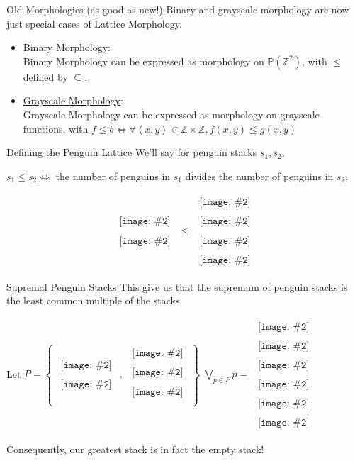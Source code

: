 \documentclass{beamer}
\newcommand{\pic}[2]{
     \begin{array}{l}
      \texttt{[image: \#2]}
      \end{array}
}
\newcommand{\set}[1]{\left\lbrace #1 \right\rbrace}
\newcommand{\tuple}[1]{\left\langle #1 \right\rangle}
\newcommand{\power}[1]{\mathbb{P}\left(#1\right)}
\newcommand{\integers}{\mathbb{Z}}
\newcommand{\join}[1]{\displaystyle\bigvee_{#1}}
\newcommand{\partialless}{\leqslant}
\newcommand{\penguin}[1]{
  \pic{width=#1}{images/tux.png}
}
\begin{document}
\begin{frame}{Old Morphologies (as good as new!)}
  Binary and grayscale morphology are now just special cases of 
  Lattice Morphology.
  \begin{itemize}
    \item \underline{Binary Morphology}:\\
          Binary Morphology can be expressed as morphology on
          $\power{\integers^2}$, with $\partialless$ defined by $\subseteq$.
    \item \underline{Grayscale Morphology}:\\
          Grayscale Morphology can be expressed as morphology on
          grayscale functions, with 
          $f \partialless b \iff 
          \forall \tuple{x,y} \in \integers \times \integers,
          f(x,y) \leq g(x,y)$
  \end{itemize}
\end{frame}


\begin{frame}{Defining the Penguin Lattice}
  We'll say for penguin stacks $s_1, s_2$, 

  $s_1 \partialless s_2 \iff $ the number of penguins in $s_1$ divides
                               the number of penguins in $s_2$.
  
  $$\substack{\penguin{20pt}\\\penguin{20pt}}
    \partialless
    \substack{\penguin{20pt}\\\penguin{20pt}\\
              \penguin{20pt}\\\penguin{20pt}}$$
\end{frame}

\begin{frame}{Supremal Penguin Stacks}
  This give us that the supremum of penguin stacks is the least
  common multiple of the stacks.

  Let $P = \set{\substack{\penguin{10pt}\\\penguin{10pt}},
                \substack{\penguin{10pt}\\\penguin{10pt}\\
                          \penguin{10pt}\\}}$
  $\join{p\in P}p = \substack{\penguin{10pt}\\\penguin{10pt}\\
                        \penguin{10pt}\\\penguin{10pt}\\
                        \penguin{10pt}\\\penguin{10pt}}$

   Consequently, our greatest stack is in fact the empty stack!
\end{frame}
\end{document}
